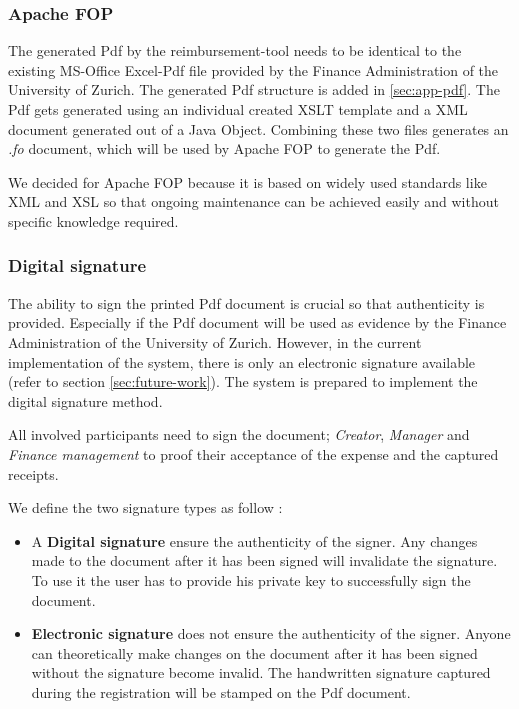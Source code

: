 \subsubsection{Apache FOP}
The generated Pdf by the reimbursement-tool needs to be identical to the existing MS-Office Excel-Pdf file provided by the Finance Administration of the University of Zurich. The generated Pdf structure is added in \ref{sec:app-pdf}.\newline
The Pdf gets generated using an individual created XSLT template and a XML document generated out of a Java Object. Combining these two files generates an \textit{.fo} document, which will be used by Apache FOP \cite{apache-fop} to generate the Pdf.\par
We decided for Apache FOP because it is based on widely used standards like XML and XSL so that ongoing maintenance can be achieved easily and without specific knowledge required.

\subsubsection{Digital signature}
The ability to sign the printed Pdf document is crucial so that authenticity is provided. Especially if the Pdf document will be used as evidence by the Finance Administration of the University of Zurich. However, in the current implementation of the system, there is only an electronic signature available (refer to section \ref{sec:future-work}). The system is prepared to implement the digital signature method. \par

All involved participants need to sign the document; \textit{Creator}, \textit{Manager} and \textit{Finance management} to proof their acceptance of the expense and the captured receipts. \par 

We define the two signature types as follow \cite{arx-signature}:
\begin{itemize}
    \item A \textbf{Digital signature} ensure the authenticity of the signer. Any changes made to the document after it has been signed will invalidate the signature. To use it the user has to provide his private key to successfully sign the document.
    \item \textbf{Electronic signature} does not ensure the authenticity of the signer. Anyone can theoretically make changes on the document after it has been signed without the signature become invalid. The handwritten signature captured during the registration will be stamped on the Pdf document.
\end{itemize}

